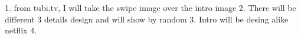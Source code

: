 1. from tubi.tv, I will take the swipe image over the intro image
2. There will be different 3 details design and will show by random
3. Intro will be desing alike netflix
4.